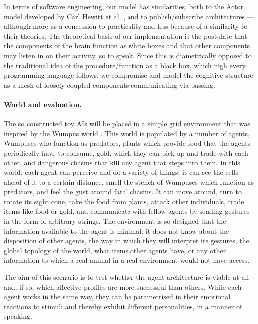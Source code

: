 In terms of software engineering, our model has similarities, both to the Actor model developed by Carl Hewitt et al. \cite{hewittActor}, and to publish/subscribe architectures \cite{publishSubscribe} --- although more as a concession to practicality and less because of a similarity to their theories. The theoretical basis of our implementation is the postulate that the components of the brain function as white boxes and that other components may listen in on their activity, so to speak. Since this is diametrically opposed to the traditional idea of the procedure/function as a black box, which nigh every programming language follows, we compromise and model the cognitive structure as a mesh of loosely coupled components communicating via passing.


\paragraph{World and evaluation.} The so constructed toy AIs will be placed in a simple grid environment that was inspired by the Wumpus world \cite{norvig}. This world is populated by a number of agents, Wumpuses who function as predators, plants which provide food that the agents periodically have to consume, gold, which they can pick up and trade with each other, and dangerous chasms that kill any agent that steps into them. In this world, each agent can perceive and do a variety of things: it can see the cells ahead of it to a certain distance, smell the stench of Wumpuses which function as predators, and feel the gust around fatal chasms. It can move around, turn to rotate its sight cone, take the food from plants, attack other individuals, trade items like food or gold, and communicate with fellow agents by sending gestures in the form of arbitrary strings. The environment is so designed that the information available to the agent is minimal: it does not know about the disposition of other agents, the way in which they will interpret its gestures, the global topology of the world, what items other agents have, or any other information to which a real animal in a real environment would not have access.

The aim of this scenario is to test whether the agent architecture is viable at all and, if so, which affective profiles are more successful than others. While each agent works in the same way, they can be parametrised in their emotional reactions to stimuli and thereby exhibit different personalities, in a manner of speaking. 

